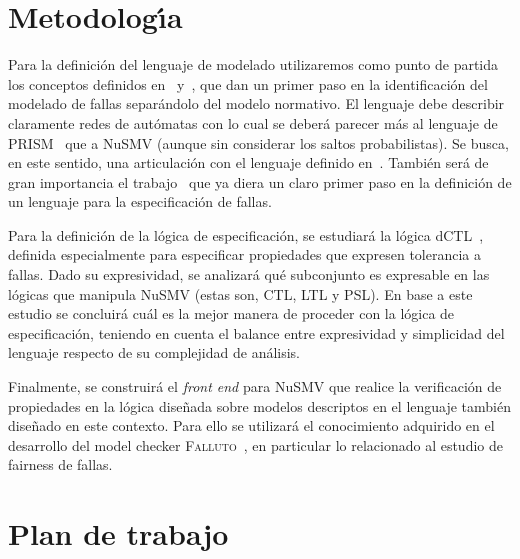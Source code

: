 \documentclass[12pt]{article}
\newcommand{\falluto}{\textsc{Falluto}}
\begin{document}
\section{Metodolog\'\i{}a}

Para la definici\'on del lenguaje de modelado utilizaremos como punto
de partida los conceptos definidos en~\cite{AG1993}
y~\cite{Gartner1998}, que dan un primer paso en la identificaci\'on del
modelado de fallas separ\'andolo del modelo normativo.  El lenguaje
debe describir claramente redes de aut\'omatas con lo cual se deber\'a
parecer m\'as al lenguaje de PRISM~\cite{thesis:parker,prism} que a
NuSMV (aunque sin considerar los saltos probabilistas). Se busca, en
este sentido, una articulaci\'on con el lenguaje definido
en~\cite{Bordenabe2011}.  Tambi\'en ser\'a de gran importancia el
trabajo~\cite{Hames2009} que ya diera un claro primer paso en la
definici\'on de un lenguaje para la especificaci\'on de fallas.

Para la definici\'on de la l\'ogica de especificaci\'on, se
estudiar\'a la l\'ogica dCTL~\cite{CastroEtAl2011}, definida
especialmente para especificar propiedades que expresen tolerancia a
fallas.  Dado su expresividad, se analizar\'a qu\'e subconjunto es
expresable en las l\'ogicas que manipula NuSMV (estas son, CTL, LTL y
PSL).  En base a este estudio se concluir\'a cu\'al es la mejor manera
de proceder con la l\'ogica de especificaci\'on, teniendo en cuenta el
balance entre expresividad y simplicidad del lenguaje respecto de su
complejidad de an\'alisis.

Finalmente, se construir\'a el \emph{front end} para NuSMV que realice
la verificaci\'on de propiedades en la l\'ogica dise\~nada sobre
modelos descriptos en el lenguaje tambi\'en dise\~nado en este
contexto.  Para ello se utilizar\'a el conocimiento adquirido en el
desarrollo del model checker \falluto~\cite{Hames2009}, en particular
lo relacionado al estudio de fairness de fallas.



\section{Plan de trabajo}
\end{document}
